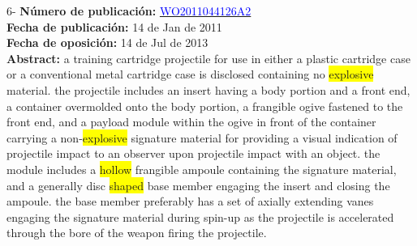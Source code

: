  \vspace{1cm}6- \textbf{Número de publicación:} \href{https://worldwide.espacenet.com/publicationDetails/biblio?DB=EPODOC&II=0&ND=3&adjacent=true&locale=en_EP&FT=D&date=20160331&CC=WO&NR=2011044126A2&KC=A2#}{\textcolor{blue}{WO2011044126A2}}\\ 
\textbf{Fecha de publicación:} 14 de Jan de 2011\\ 
\textbf{Fecha de oposición:} 14 de Jul de 2013\\ 
\textbf{Abstract:} a training cartridge projectile for use in either a plastic cartridge case or a conventional metal cartridge case is disclosed containing no \colorbox{yellow}{explosive} material. the projectile includes an insert having a body portion and a front end, a container overmolded onto the body portion, a frangible ogive fastened to the front end, and a payload module within the ogive in front of the container carrying a non-\colorbox{yellow}{explosive} signature material for providing a visual indication of projectile impact to an observer upon projectile impact with an object. the module includes a \colorbox{yellow}{\colorbox{yellow}{hollow}} frangible ampoule containing the signature material, and a generally disc \colorbox{yellow}{shaped} base member engaging the insert and closing the ampoule. the base member preferably has a set of axially extending vanes engaging the signature material during spin-up as the projectile is accelerated through the bore of the weapon firing the projectile.\\ 
 

